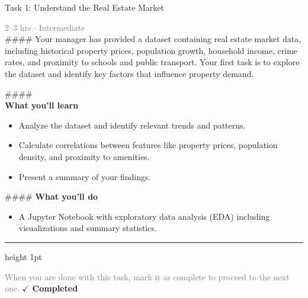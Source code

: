 \documentclass[10pt,a4paper]{article}
\begin{document}
\begin{taskbox}{Task 1: Understand the Real Estate Market}

    {\small \textcolor{gray}{2--3 hrs $\cdot$ Intermediate}}\\[12pt]

    \#\#\#\# 
Your manager has provided a dataset containing real estate market data, including historical property prices, population growth, household income, crime rates, and proximity to schools and public transport. Your first task is to explore the dataset and identify key factors that influence property demand.

\#\#\#\# \\[10pt]
\vspace{8pt}
{\large \textbf{\textcolor{brandLight}{What you'll learn}}}\\[4pt]
\begin{itemize}
    \item Analyze the dataset and identify relevant trends and patterns.
    \item Calculate correlations between features like property prices, population density, and proximity to amenities.
    \item Present a summary of your findings.
\end{itemize}

\#\#\#\# \vspace{8pt}
{\large \textbf{\textcolor{brandLight}{What you'll do}}}\\[4pt]
\begin{itemize}
    \item A Jupyter Notebook with exploratory data analysis (EDA) including visualizations and summary statistics.\par
\end{itemize}

    \vspace{16pt}

    \textcolor{cardBorder}{\hrule height 1pt}\vspace{8pt}

    \small \textcolor{gray}{When you are done with this task, mark it as complete to proceed to the next one.} \hfill \textbf{\textcolor{brandDark}{$\checkmark$ Completed}}

\end{taskbox}
\end{document}

